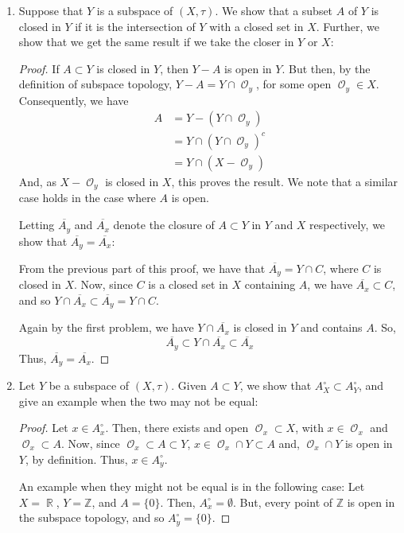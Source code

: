 \documentclass{book}
\DeclareMathOperator*{\R}{\mathbb{R}}
\DeclareMathOperator*{\Ocal}{\mathcal{O}}
\begin{document}
\begin{enumerate}[(1)]
    \item Suppose that $Y$ is a subspace of $(X, \tau)$. We show that a subset $A$ of $Y$ is closed in $Y$ if it is the intersection of $Y$ with a closed set in $X$. Further, we show that we get the same result if we take the closer in $Y$ or $X$: 
        \begin{proof} If $A \subset Y$ is closed in $Y$, then $Y - A$ is open in $Y$. But then, by the definition of subspace topology, $Y - A = Y \cap {\Ocal}_y$, for some open ${\Ocal}_y \in X$. Consequently, we have 
            \begin{align*}
                A & = Y - (Y \cap {\Ocal}_y) \\
                & = Y \cap (Y \cap {\Ocal}_y)^c \\
                & = Y \cap (X - {\Ocal}_y)
            \end{align*}
            And, as $X - {\Ocal}_y$ is closed in $X$, this proves the result. We note that a similar case holds in the case where $A$ is open.
            \par Letting $\overline{A_y}$ and $\overline{A_x}$ denote the closure of $A \subset Y$ in $Y$ and $X$ respectively, we show that  $\overline{A_y} = \overline{A_x}$: 
            \newline \par  From the previous part of this proof, we have that $\overline{A_y} = Y \cap C$, where $C$ is closed in $X$. Now, since $C$ is a closed set in $X$ containing $A$, we have $\overline{A_x} \subset C$, and so $Y \cap \overline{A_x} \subset \overline{A_y} = Y \cap C$. 
            \par Again by the first problem, we have $Y \cap \overline{A_x}$ is closed in $Y$ and contains $A$. So, 
            \[ \overline{A_y} \subset Y \cap \overline{A_x} \subset \overline{A_x}\]
            Thus, $\overline{A_y} = \overline{A_x}$. 
        \end{proof}

    \item Let $Y$ be a subspace of $(X, \tau)$. Given $A \subset Y$, we show that $A_X^\circ \subset A_Y^\circ$, and give an example when the two may not be equal: 
        \begin{proof} Let $x \in A_x^\circ$. Then, there exists and open ${\Ocal}_x \subset X$, with $x \in {\Ocal}_x$ and ${\Ocal}_x \subset A$. Now, since ${\Ocal}_x \subset A \subset Y$, $x \in {\Ocal}_x \cap Y \subset A$ and, ${\Ocal}_x \cap Y$ is open in $Y$, by definition. Thus, $x \in A_y^\circ$. 
            \par An example when they might not be equal is in the following case: Let $X = \R$, $Y = \mathbb{Z}$, and $A = \{0\}$. Then, $A_x^\circ = \emptyset$. But, every point of $\mathbb{Z}$ is open in the subspace topology, and so $A_y^\circ = \{ 0\}$. 
        \end{proof}


\end{enumerate}
\end{document}
